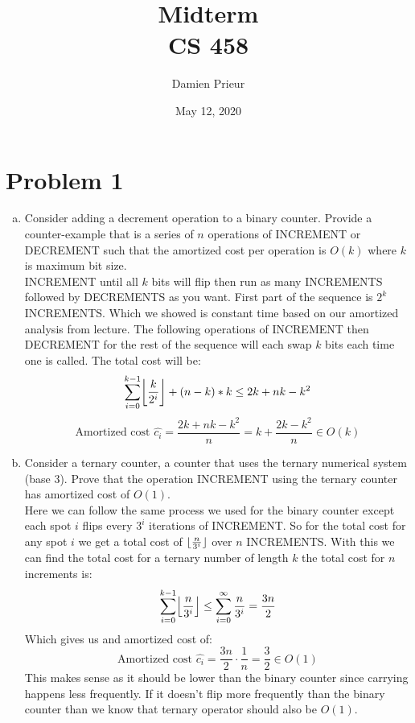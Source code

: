 \documentclass{article}
\author{Damien Prieur}
\title{Midterm \\ CS 458}
\date{May 12, 2020}
\DeclarePairedDelimiter\floor{\lfloor}{\rfloor}
\begin{document}
\maketitle

\section*{Problem 1}
\begin{enumerate}[a.]
\item Consider adding a decrement operation to a binary counter.
Provide a counter-example that is a series of $n$ operations of INCREMENT or DECREMENT such that the amortized cost per operation is $O(k)$ where $k$ is maximum bit size. \\
\newline
\indent INCREMENT until all $k$ bits will flip then run as many INCREMENTS followed by DECREMENTS as you want.
First part of the sequence is $2^k$ INCREMENTS.
Which we showed is constant time based on our amortized analysis from lecture.
The following operations of INCREMENT then DECREMENT for the rest of the sequence will each swap $k$ bits each time one is called.
The total cost will be:
$$\sum_{i=0}^{k-1}\floor*{\frac{k}{2^i}} + (n-k)*k \leq 2k + nk - k^2$$
$$\text{Amortized cost } \hat{c_i} = \frac{2k+nk-k^2}{n} = k + \frac{2k - k^2}{n} \in O(k)$$
\item Consider a ternary counter, a counter that uses the ternary numerical system (base 3).
Prove that the operation INCREMENT using the ternary counter has amortized cost of $O(1)$.\\
\newline
\indent Here we can follow the same process we used for the binary counter except each spot $i$ flips every $3^i$ iterations of INCREMENT.
So for the total cost for any spot $i$ we get a total cost of $\floor{\frac{n}{3^i}}$ over $n$ INCREMENTS.
With this we can find the total cost for a ternary number of length $k$ the total cost for $n$ increments is:
$$\sum_{i=0}^{k-1}\floor*{\frac{n}{3^i}} \leq \sum_{i=0}^{\infty}\frac{n}{3^i} = \frac{3n}{2}$$
Which gives us and amortized cost of:
$$\text{Amortized cost } \hat{c_i} = \frac{3n}{2}\cdot\frac{1}{n} = \frac{3}{2} \in O(1)$$
This makes sense as it should be lower than the binary counter since carrying happens less frequently.
If it doesn't flip more frequently than the binary counter than we know that ternary operator should also be $O(1)$.
\end{enumerate}

\newpage
\end{document}
